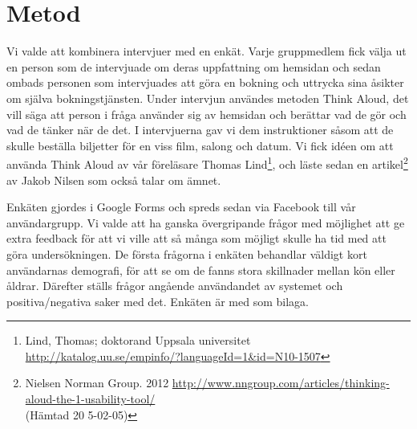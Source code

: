 \documentclass[swedish,a4paper,11pt]{article}
\begin{document}
\section{Metod}
Vi valde att kombinera intervjuer med en enkät. Varje gruppmedlem fick välja ut en person som de intervjuade om deras uppfattning om hemsidan och sedan ombads personen som intervjuades att göra en bokning och uttrycka sina åsikter om själva bokningstjänsten. Under intervjun användes metoden Think Aloud, det vill säga att person i fråga använder sig av hemsidan och berättar vad de gör och vad de tänker när de det. I intervjuerna gav vi dem instruktioner såsom att de skulle beställa biljetter för en viss film, salong och datum. Vi fick idéen om att använda Think Aloud av vår föreläsare Thomas Lind\footnote{Lind, Thomas; doktorand Uppsala universitet\\
\url{http://katalog.uu.se/empinfo/?languageId=1&id=N10-1507}}, och läste sedan en artikel\footnote{Nielsen Norman Group. 2012 \url{http://www.nngroup.com/articles/thinking-aloud-the-1-usability-tool/}\\{(Hämtad 20
5-02-05)}} av Jakob Nilsen som också talar om ämnet.

Enkäten gjordes i Google Forms och spreds sedan via Facebook till vår användargrupp. Vi valde att ha ganska övergripande frågor med möjlighet att ge extra feedback för att vi ville att så många som möjligt skulle ha tid med att göra undersökningen. De första frågorna i enkäten behandlar väldigt kort användarnas demografi, för att se om de fanns stora skillnader mellan kön eller åldrar. Därefter ställs frågor angående användandet av systemet och positiva/negativa saker med det. Enkäten är med som bilaga.
\end{document}
